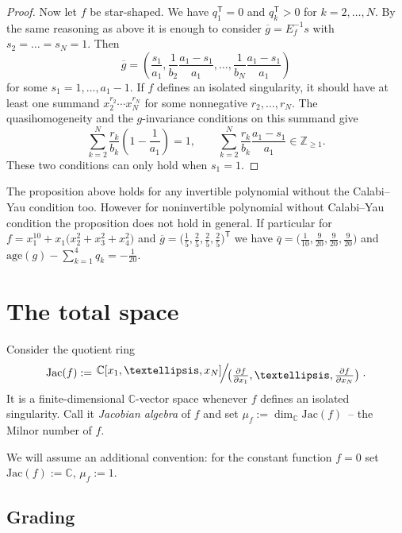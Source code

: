 \documentclass[10pt,a4paper]{article}
\numberwithin{equation}{section}
\newcommand{\CC}{{\mathbb{C}}}
\newcommand{\ZZ}{{\mathbb{Z}}}
\newcommand{\Jac}{\mathrm{Jac}}
\newcommand{\age}{\mathrm{age}}
\newcommand{\QR}[2]{
\left.\raisebox{0.5ex}{\ensuremath{#1}}
\ensuremath{\mkern-3mu}\Big/\ensuremath{\mkern-3mu}
\raisebox{-0.5ex}{\ensuremath{#2}}\right.}
\begin{document}
\begin{proof}
Now let $f$ be star-shaped. We have $q_1^{\mathsf{T}} = 0$ and $q_k^{\mathsf{T}} > 0$ for $k=2,\dots,N$. By the same reasoning as above it is enough to consider $\overline g = E_f^{-1}s$ with $s_2 = \dots = s_N = 1$. Then
\[
 \overline g = \left(\frac{s_1}{a_1}, \frac{1}{b_2}\frac{a_1-s_1}{a_1}, \dots, \frac{1}{b_{N}}\frac{a_1-s_1}{a_1} \right)
\]
for some $s_1 = 1,\dots,a_1-1$.
If $f$ defines an isolated singularity, it should have at least one summand $x_2^{r_2}\cdots x_N^{r_N}$ for some nonnegative $r_2,\dots,r_N$. The quasihomogeneity and the $g$-invariance conditions on this summand give
\[
 \sum_{k=2}^N \frac{r_k}{b_k}\left(1 - \frac{1}{a_1}\right) = 1, \qquad \sum_{k=2}^N \frac{r_k}{b_k}\frac{a_1-s_1}{a_1} \in \ZZ_{\ge 1}.
\]
These two conditions can only hold when $s_1=1$.
\end{proof}

\begin{Remark}
The proposition above holds for any invertible polynomial without the Calabi--Yau condition too. However for noninvertible polynomial without Calabi--Yau condition the proposition does not hold in general. If particular for ${f = x_1^{10} + x_1\bigl(x_2^2 + x_3^2 + x_4^2\bigr)}$ and $\overline g = \bigl(\frac{1}{5},\frac{2}{5},\frac{2}{5},\frac{2}{5}\bigr)^{\mathsf{T}}$ we have $\overline q = \bigl(\frac{1}{10},\frac{9}{20},\frac{9}{20},\frac{9}{20}\bigr)$ and $\age(g) - \sum_{k=1}^4 q_k = -\frac{1}{20}$.
\end{Remark}

\section{The total space}\label{section: total space}
Consider the quotient ring
\begin{equation*}
	\Jac(f) := \QR{\CC[x_1,\dots, x_N]}{\bigl(\frac{\partial f}{\partial x_1},\dots,\frac{\partial f}{\partial x_N}\bigr)}.
\end{equation*}
It is a finite-dimensional $\CC$-vector space whenever $f$ defines an isolated singularity.
Call it {\em Jacobian algebra} of $f$ and set $\mu_f:=\dim_\CC\Jac(f)$~-- the Milnor number of $f$.

We will assume an additional convention:
for the constant function $f = 0$ set $\Jac(f) := \CC$, $\mu_f := 1$.

\subsection{Grading}
\end{document}
